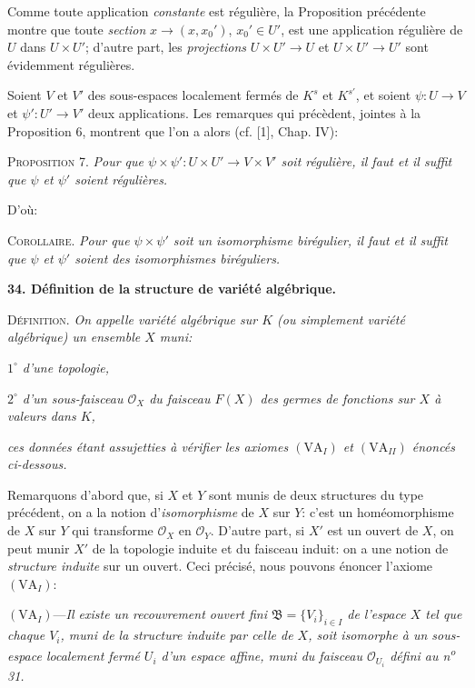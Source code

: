 Comme toute application \textit{constante} est régulière, la Proposition précédente montre que toute \textit{section} $x \to (x, x_0')$, $x_0' \in U'$, est une application régulière de $U$ dans $U \times U'$; d'autre part, les \textit{projections} $U \times U' \to U$ et $U \times U' \to U'$ sont évidemment régulières.

Soient $V$ et $V'$ des sous-espaces localement fermés de $K^s$ et $K^{s'}$, et soient $\psi\colon U \to V$ et $\psi'\colon U' \to V'$ deux applications. Les remarques qui précèdent, jointes à la Proposition 6, montrent que l'on a alors (cf. [1], Chap. IV):

\textsc{Proposition 7.} \textit{Pour que $\psi \times \psi' : U \times U' \to V \times V'$ soit régulière, il faut et il suffit que $\psi$ et $\psi'$ soient régulières.}

D'où:

\textsc{Corollaire.} \textit{Pour que $\psi \times \psi'$ soit un isomorphisme birégulier, il faut et il suffit que $\psi$ et $\psi'$ soient des isomorphismes biréguliers.}


\textbf{34. Définition de la structure de variété algébrique.}

\textsc{Définition.} \textit{On appelle variété algébrique sur $K$ (ou simplement variété algébrique) un ensemble $X$ muni:}

\textit{$1^\circ$ d'une topologie,}

\textit{$2^\circ$ d'un sous-faisceau $\mathcal{O}_X$ du faisceau $F(X)$ des germes de fonctions sur $X$ à valeurs dans $K$,}

\textit{ces données étant assujetties à vérifier les axiomes $(\mathrm{VA}_I)$ et $(\mathrm{VA}_{II})$ énoncés ci-dessous.}

Remarquons d'abord que, si $X$ et $Y$ sont munis de deux structures du type précédent, on a la notion d'\textit{isomorphisme} de $X$ sur $Y$: c'est un homéomorphisme de $X$ sur $Y$ qui transforme $\mathcal{O}_X$ en $\mathcal{O}_Y$. D'autre part, si $X'$ est un ouvert de $X$, on peut munir $X'$ de la topologie induite et du faisceau induit: on a une notion de \textit{structure induite} sur un ouvert. Ceci précisé, nous pouvons énoncer l'axiome $(\mathrm{VA}_I)$:

$(\mathrm{VA}_I)$---\textit{Il existe un recouvrement ouvert fini $\mathfrak{B} = \{V_i\}_{i \in I}$ de l'espace $X$ tel que chaque $V_i$, muni de la structure induite par celle de $X$, soit isomorphe à un sous-espace localement fermé $U_i$ d'un espace affine, muni du faisceau $\mathcal{O}_{U_i}$ défini au n\textsuperscript{o} 31.}

